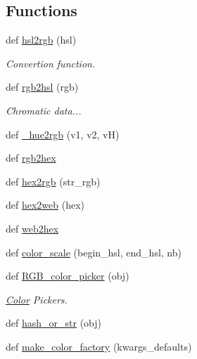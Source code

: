 \subsection*{Functions}
\begin{DoxyCompactItemize}
\item 
def \hyperlink{namespacecolour_addc80d0ed1260fc29d85da0a87e839f2}{hsl2rgb} (hsl)
\begin{DoxyCompactList}\small\item\em Convertion function. \end{DoxyCompactList}\item 
def \hyperlink{namespacecolour_aa40a4592b35b3c69d656c00cf4814fee}{rgb2hsl} (rgb)
\begin{DoxyCompactList}\small\item\em Chromatic data... \end{DoxyCompactList}\item 
def \hyperlink{namespacecolour_a2f09d350147b947d6132a6a600a98237}{\+\_\+hue2rgb} (v1, v2, v\+H)
\item 
def \hyperlink{namespacecolour_a65e930f43529c0034eeeae58b366f805}{rgb2hex}
\item 
def \hyperlink{namespacecolour_acf33cb42fb72c6ed287f82b78d302558}{hex2rgb} (str\+\_\+rgb)
\item 
def \hyperlink{namespacecolour_aa0c2229171d31dc54467b5a0772a32fd}{hex2web} (hex)
\item 
def \hyperlink{namespacecolour_a5ea9eb352df7e5700013fa3a90900d7f}{web2hex}
\item 
def \hyperlink{namespacecolour_abf7ee06f8083a3579bc2562974cb7332}{color\+\_\+scale} (begin\+\_\+hsl, end\+\_\+hsl, nb)
\item 
def \hyperlink{namespacecolour_a60552e6a5ebf924698dd9ba0f7cbd963}{R\+G\+B\+\_\+color\+\_\+picker} (obj)
\begin{DoxyCompactList}\small\item\em \hyperlink{classcolour_1_1Color}{Color} Pickers. \end{DoxyCompactList}\item 
def \hyperlink{namespacecolour_aa31b702d88f49865f4bcad85aa709363}{hash\+\_\+or\+\_\+str} (obj)
\item 
def \hyperlink{namespacecolour_aeb48782548179b2f488fbf820d49a8a3}{make\+\_\+color\+\_\+factory} (kwargs\+\_\+defaults)
\end{DoxyCompactItemize}
